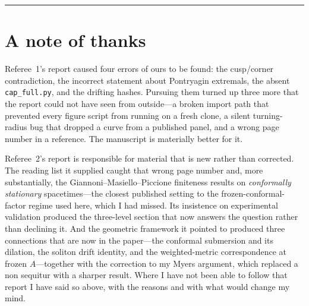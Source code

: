 \documentclass[11pt]{article}
\begin{document}
\bigskip
\hrule
\section*{A note of thanks}

Referee~1's report caused four errors of ours to be found: the cusp/corner
contradiction, the incorrect statement about Pontryagin extremals, the absent
\texttt{cap\_full.py}, and the drifting hashes. Pursuing them turned up three
more that the report could not have seen from outside---a broken import path that
prevented every figure script from running on a fresh clone, a silent
turning-radius bug that dropped a curve from a published panel, and a wrong page
number in a reference. The manuscript is materially better for it.

Referee~2's report is responsible for material that is new rather than corrected.
The reading list it supplied caught that wrong page number and, more substantially,
the Giannoni--Masiello--Piccione finiteness results on \emph{conformally stationary}
spacetimes---the closest published setting to the frozen-conformal-factor regime
used here, which I had missed. Its insistence on experimental validation produced
the three-level section that now answers the question rather than declining it. And
the geometric framework it pointed to produced three connections that are now in the
paper---the conformal submersion and its dilation, the soliton drift identity, and
the weighted-metric correspondence at frozen $A$---together with the correction to my
Myers argument, which replaced a non sequitur with a sharper result. Where I have not
been able to follow that report I have said so above, with the reasons and with what
would change my mind.
\end{document}
